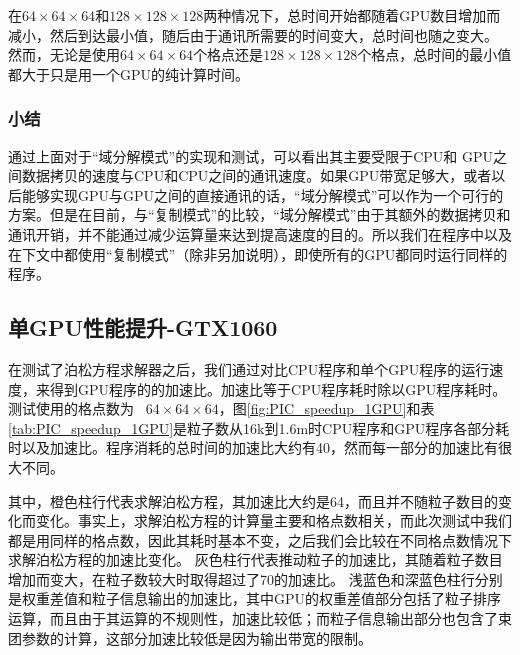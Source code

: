 在$64 \times 64 \times 64$和$128 \times 128 \times 128$两种情况下，总时间开始都随着GPU数目增加而减小，然后到达最小值，随后由于通讯所需要的时间变大，总时间也随之变大。
然而，无论是使用$64 \times 64 \times 64$个格点还是$128 \times 128 \times 128$个格点，总时间的最小值都大于只是用一个GPU的纯计算时间。
\subsubsection{小结}
通过上面对于“域分解模式”的实现和测试，可以看出其主要受限于CPU和 GPU之间数据拷贝的速度与CPU和CPU之间的通讯速度。如果GPU带宽足够大，或者以后能够实现GPU与GPU之间的直接通讯的话，“域分解模式”可以作为一个可行的方案。但是在目前，与“复制模式”的比较，“域分解模式”由于其额外的数据拷贝和通讯开销，并不能通过减少运算量来达到提高速度的目的。所以我们在程序中以及在下文中都使用“复制模式”（除非另加说明），即使所有的GPU都同时运行同样的程序。



\subsection{单GPU性能提升-GTX1060}
在测试了泊松方程求解器之后，我们通过对比CPU程序和单个GPU程序的运行速度，来得到GPU程序的的加速比。加速比等于CPU程序耗时除以GPU程序耗时。测试使用的格点数为~ $64 \times 64 \times 64$，图\ref{fig:PIC_speedup_1GPU}和表\ref{tab:PIC_speedup_1GPU}是粒子数从16k到1.6m时CPU程序和GPU程序各部分耗时以及加速比。程序消耗的总时间的加速比大约有40，然而每一部分的加速比有很大不同。

其中，橙色柱行代表求解泊松方程，其加速比大约是64，而且并不随粒子数目的变化而变化。事实上，求解泊松方程的计算量主要和格点数相关，而此次测试中我们都是用同样的格点数，因此其耗时基本不变，之后我们会比较在不同格点数情况下求解泊松方程的加速比变化。
灰色柱行代表推动粒子的加速比，其随着粒子数目增加而变大，在粒子数较大时取得超过了70的加速比。
浅蓝色和深蓝色柱行分别是权重差值和粒子信息输出的加速比，其中GPU的权重差值部分包括了粒子排序运算，而且由于其运算的不规则性，加速比较低；而粒子信息输出部分也包含了束团参数的计算，这部分加速比较低是因为输出带宽的限制。


